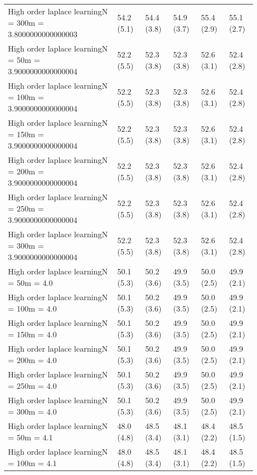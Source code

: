 \documentclass{article}
\begin{document}
\begin{table*}[t!]
\begin{center}
\begin{small}
\begin{sc}
\begin{tabular}{llllll}
High order laplace learningN = 300m = 3.8000000000000003&54.2 (5.1)      &54.4 (3.8)      &54.9 (3.7)      &55.4 (2.9)      &55.1 (2.7)      \\
High order laplace learningN = 50m = 3.9000000000000004&52.2 (5.5)      &52.3 (3.8)      &52.3 (3.8)      &52.6 (3.1)      &52.4 (2.8)      \\
High order laplace learningN = 100m = 3.9000000000000004&52.2 (5.5)      &52.3 (3.8)      &52.3 (3.8)      &52.6 (3.1)      &52.4 (2.8)      \\
High order laplace learningN = 150m = 3.9000000000000004&52.2 (5.5)      &52.3 (3.8)      &52.3 (3.8)      &52.6 (3.1)      &52.4 (2.8)      \\
High order laplace learningN = 200m = 3.9000000000000004&52.2 (5.5)      &52.3 (3.8)      &52.3 (3.8)      &52.6 (3.1)      &52.4 (2.8)      \\
High order laplace learningN = 250m = 3.9000000000000004&52.2 (5.5)      &52.3 (3.8)      &52.3 (3.8)      &52.6 (3.1)      &52.4 (2.8)      \\
High order laplace learningN = 300m = 3.9000000000000004&52.2 (5.5)      &52.3 (3.8)      &52.3 (3.8)      &52.6 (3.1)      &52.4 (2.8)      \\
High order laplace learningN = 50m = 4.0&50.1 (5.3)      &50.2 (3.6)      &49.9 (3.5)      &50.0 (2.5)      &49.9 (2.1)      \\
High order laplace learningN = 100m = 4.0&50.1 (5.3)      &50.2 (3.6)      &49.9 (3.5)      &50.0 (2.5)      &49.9 (2.1)      \\
High order laplace learningN = 150m = 4.0&50.1 (5.3)      &50.2 (3.6)      &49.9 (3.5)      &50.0 (2.5)      &49.9 (2.1)      \\
High order laplace learningN = 200m = 4.0&50.1 (5.3)      &50.2 (3.6)      &49.9 (3.5)      &50.0 (2.5)      &49.9 (2.1)      \\
High order laplace learningN = 250m = 4.0&50.1 (5.3)      &50.2 (3.6)      &49.9 (3.5)      &50.0 (2.5)      &49.9 (2.1)      \\
High order laplace learningN = 300m = 4.0&50.1 (5.3)      &50.2 (3.6)      &49.9 (3.5)      &50.0 (2.5)      &49.9 (2.1)      \\
High order laplace learningN = 50m = 4.1&48.0 (4.8)      &48.5 (3.4)      &48.1 (3.1)      &48.4 (2.2)      &48.5 (1.5)      \\
High order laplace learningN = 100m = 4.1&48.0 (4.8)      &48.5 (3.4)      &48.1 (3.1)      &48.4 (2.2)      &48.5 (1.5)      \\

\end{tabular}
\end{sc}
\end{small}
\end{center}
\end{table*}
\end{document}
